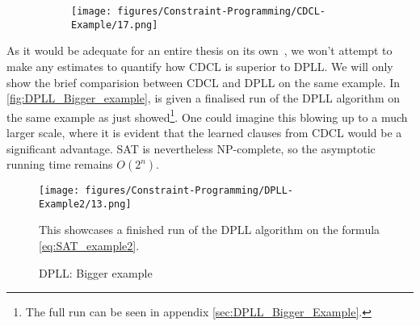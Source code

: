 \begin{figure}[H]
    \centering
    \begin{subfigure}[t]{0.48\textwidth}
        \centering
        \texttt{[image: figures/Constraint-Programming/CDCL-Example/17.png]}
    \end{subfigure}
\end{figure}

As it would be adequate for an entire thesis on its own~\cite{All-SAT-Solvers}, we won't attempt to make any estimates to quantify how CDCL is superior to DPLL. We will only show the brief comparision between CDCL and DPLL on the same example. In \autoref{fig:DPLL_Bigger_example}, is given a finalised run of the DPLL algorithm on the same example as just showed\footnote{The full run can be seen in appendix \autoref{sec:DPLL_Bigger_Example}.}. One could imagine this blowing up to a much larger scale, where it is evident that the learned clauses from CDCL would be a significant advantage. SAT is nevertheless NP-complete, so the asymptotic running time remains \(O(2^n)\).  

\begin{figure}[H]
    \centering
    \texttt{[image: figures/Constraint-Programming/DPLL-Example2/13.png]}
    \caption{DPLL: Bigger example}
    \small
    \raggedright 
    This showcases a finished run of the DPLL algorithm on the formula \autoref{eq:SAT_example2}.
    \label{fig:DPLL_Bigger_example}
\end{figure}


